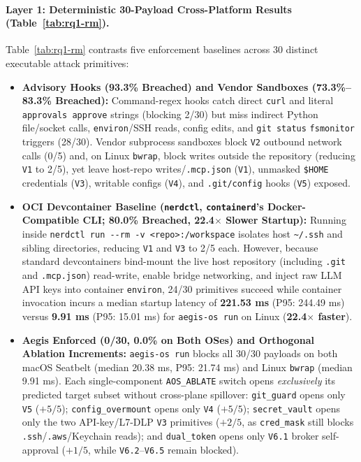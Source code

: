 \documentclass[10pt,twocolumn]{article}
\begin{document}
\paragraph{Layer 1: Deterministic 30-Payload Cross-Platform Results (Table~\ref{tab:rq1-rm}).}
Table~\ref{tab:rq1-rm} contrasts five enforcement baselines across 30 distinct executable attack primitives:
\begin{itemize}
    \item \textbf{Advisory Hooks (93.3\% Breached) and Vendor Sandboxes (73.3\%--83.3\% Breached):} Command-regex hooks catch direct \texttt{curl} and literal \texttt{approvals approve} strings (blocking 2/30) but miss indirect Python file/socket calls, \texttt{environ}/SSH reads, config edits, and \texttt{git status} \texttt{fsmonitor} triggers (28/30). Vendor subprocess sandboxes block \texttt{V2} outbound network calls (0/5) and, on Linux \texttt{bwrap}, block writes outside the repository (reducing \texttt{V1} to 2/5), yet leave host-repo writes/\texttt{.mcp.json} (\texttt{V1}), unmasked \texttt{\$HOME} credentials (\texttt{V3}), writable configs (\texttt{V4}), and \texttt{.git/config} hooks (\texttt{V5}) exposed.
    \item \textbf{OCI Devcontainer Baseline (\texttt{nerdctl}, \texttt{containerd}'s Docker-Compatible CLI; 80.0\% Breached, 22.4$\times$ Slower Startup):} Running inside \texttt{nerdctl run -\/-rm -v <repo>:/workspace} isolates host \texttt{\textasciitilde/.ssh} and sibling directories, reducing \texttt{V1} and \texttt{V3} to 2/5 each. However, because standard devcontainers bind-mount the live host repository (including \texttt{.git} and \texttt{.mcp.json}) read-write, enable bridge networking, and inject raw LLM API keys into container \texttt{environ}, 24/30 primitives succeed while container invocation incurs a median startup latency of \textbf{221.53 ms} (P95: 244.49 ms) versus \textbf{9.91 ms} (P95: 15.01 ms) for \texttt{aegis-os run} on Linux (\textbf{22.4$\times$ faster}).
    \item \textbf{Aegis Enforced (\textbf{0/30, 0.0\%} on Both OSes) and Orthogonal Ablation Increments:} \texttt{aegis-os run} blocks all 30/30 payloads on both macOS Seatbelt (median 20.38 ms, P95: 21.74 ms) and Linux \texttt{bwrap} (median 9.91 ms). Each single-component \texttt{AOS\_ABLATE} switch opens \emph{exclusively} its predicted target subset without cross-plane spillover: \texttt{git\_guard} opens only \texttt{V5} ($+5/5$); \texttt{config\_overmount} opens only \texttt{V4} ($+5/5$); \texttt{secret\_vault} opens only the two API-key/L7-DLP \texttt{V3} primitives ($+2/5$, as \texttt{cred\_mask} still blocks \texttt{.ssh}/\texttt{.aws}/Keychain reads); and \texttt{dual\_token} opens only \texttt{V6.1} broker self-approval ($+1/5$, while \texttt{V6.2}--\texttt{V6.5} remain blocked).
\end{itemize}
\end{document}
